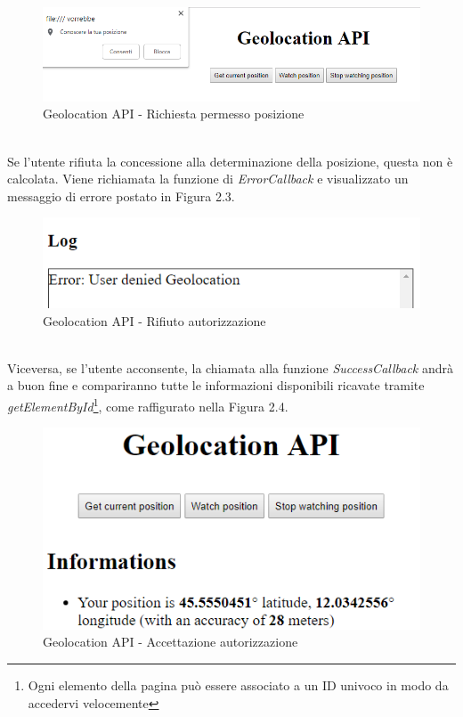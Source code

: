\documentclass[12pt ,a4paper , twoside , openright ]{book}
\begin{document}
	\begin{figure}[h]
		\centering
		\includegraphics[width=0.8\linewidth]{geo2}
		\caption{Geolocation API - Richiesta permesso posizione\cite{rif8}}
		\label{fig: Geolocation API - Richiesta permesso posizione}
	\end{figure} \\
	Se l'utente rifiuta la concessione alla determinazione della posizione, questa non è calcolata. Viene richiamata la funzione di \textit{ErrorCallback} e visualizzato un messaggio di errore postato in Figura 2.3.
	\begin{figure}[h]
		\centering
		\includegraphics[width=0.8\linewidth]{geo3}
		\caption{Geolocation API - Rifiuto autorizzazione\cite{rif8}}
		\label{fig: Geolocation API - Rifiuto autorizzazione}
	\end{figure} \\
	Viceversa, se l'utente acconsente, la chiamata alla funzione \textit{SuccessCallback} andrà a buon fine e compariranno tutte le informazioni disponibili ricavate tramite \textit{getElementById}\footnote{Ogni elemento della pagina può essere associato a un ID univoco in modo da accedervi velocemente}, come raffigurato nella Figura 2.4.
	
	\begin{figure}[h]
	 	\centering
	 	\includegraphics[width=0.5\linewidth]{geo4}
	 	\caption{Geolocation API - Accettazione autorizzazione\cite{rif8}}
	 	\label{fig: Geolocation API - Accettazione autorizzazione}
	\end{figure}
\end{document}

